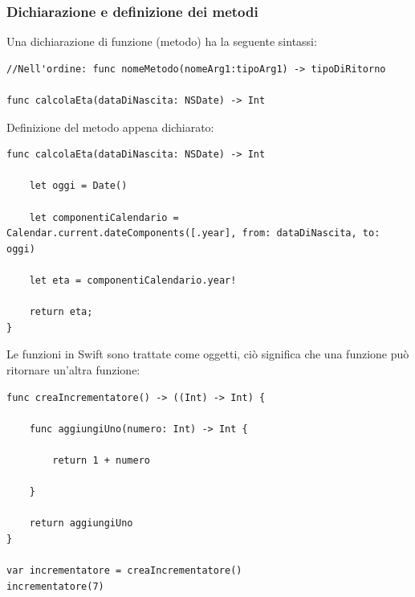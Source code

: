 \subsubsection{Dichiarazione e definizione dei metodi}
Una dichiarazione di funzione (metodo) ha la seguente sintassi: 
\lstset{language=[Objective]C, breakindent=40pt, breaklines}
\begin{lstlisting}
//Nell'ordine: func nomeMetodo(nomeArg1:tipoArg1) -> tipoDiRitorno

func calcolaEta(dataDiNascita: NSDate) -> Int

\end{lstlisting}
Definizione del metodo appena dichiarato: 
\lstset{language=[Objective]C, breakindent=40pt, breaklines}
\begin{lstlisting}
func calcolaEta(dataDiNascita: NSDate) -> Int

	let oggi = Date()
      
    let componentiCalendario = Calendar.current.dateComponents([.year], from: dataDiNascita, to: oggi)                             			
	
	let eta = componentiCalendario.year!
	
	return eta;
}
\end{lstlisting}
Le funzioni in Swift sono trattate come oggetti, ciò significa che una funzione può ritornare un'altra funzione: 
\lstset{language=[Objective]C, breakindent=40pt, breaklines}
\begin{lstlisting}
func creaIncrementatore() -> ((Int) -> Int) {
	
	func aggiungiUno(numero: Int) -> Int {
	
		return 1 + numero 
	
	}
	
	return aggiungiUno
}

var incrementatore = creaIncrementatore()
incrementatore(7)
\end{lstlisting}
